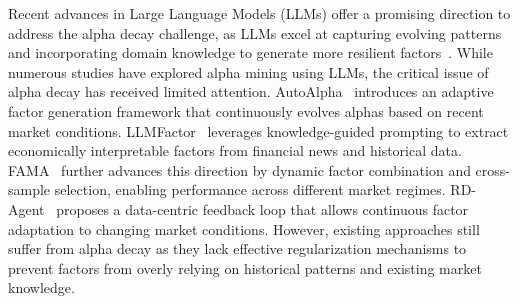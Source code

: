 Recent advances in Large Language Models (LLMs) offer a promising direction to address the alpha decay challenge, as LLMs excel at capturing evolving patterns and incorporating domain knowledge to generate more resilient factors~\cite{wang2023aligninglargelanguagemodels, haluptzok2023language, zhu2024largelanguagemodelslearn, weng2023agent, sumers2024cognitivearchitectureslanguageagents}. While numerous studies have explored alpha mining using LLMs, the critical issue of alpha decay has received limited attention. AutoAlpha~\cite{zhang2020autoalphaefficienthierarchicalevolutionary} introduces an adaptive factor generation framework that continuously evolves alphas based on recent market conditions. LLMFactor~\cite{wang2024llmfactorextractingprofitablefactors} leverages knowledge-guided prompting to extract economically interpretable factors from financial news and historical data. FAMA~\cite{li-etal-2024-large-language} further advances this direction by dynamic factor combination and cross-sample selection, enabling performance across different market regimes. RD-Agent~\cite{yang2024collaborative} proposes a data-centric feedback loop that allows continuous factor adaptation to changing market conditions. However, existing approaches still suffer from alpha decay as they lack effective regularization mechanisms to prevent factors from overly relying on historical patterns and existing market knowledge.


